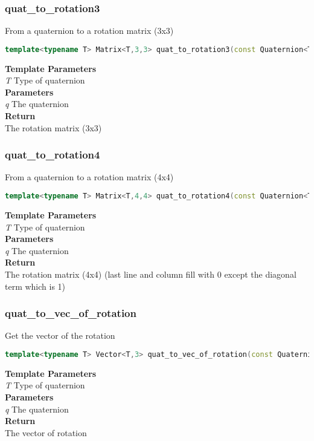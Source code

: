 \subsubsection{quat\_to\_rotation3}
\begin{mdframed}
From a quaternion to a rotation matrix (3x3)
\begin{lstlisting}[language=C++]
template<typename T> Matrix<T,3,3> quat_to_rotation3(const Quaternion<T>& q) 
\end{lstlisting}
\textbf{Template Parameters} \\ 
\textit{T} Type of quaternion \\ 
\textbf{Parameters} \\ 
\textit{q} The quaternion \\ 
\textbf{Return} \\ 
The rotation matrix (3x3)\\ 
\end{mdframed}

\subsubsection{quat\_to\_rotation4}
\begin{mdframed}
From a quaternion to a rotation matrix (4x4)
\begin{lstlisting}[language=C++]
template<typename T> Matrix<T,4,4> quat_to_rotation4(const Quaternion<T>& q) 
\end{lstlisting}
\textbf{Template Parameters} \\ 
\textit{T} Type of quaternion \\ 
\textbf{Parameters} \\ 
\textit{q} The quaternion \\ 
\textbf{Return} \\ 
The rotation matrix (4x4) (last line and column fill with 0 except the diagonal term which is 1)\\ 
\end{mdframed}

\subsubsection{quat\_to\_vec\_of\_rotation}
\begin{mdframed}
Get the vector of the rotation
\begin{lstlisting}[language=C++]
template<typename T> Vector<T,3> quat_to_vec_of_rotation(const Quaternion<T>& q) 
\end{lstlisting}
\textbf{Template Parameters} \\ 
\textit{T} Type of quaternion \\ 
\textbf{Parameters} \\ 
\textit{q} The quaternion \\ 
\textbf{Return} \\ 
The vector of rotation\\ 
\end{mdframed}

